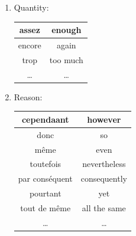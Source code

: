 \documentclass{book}
\begin{document}
\begin{enumerate}
            \item Quantity:
                \begin{center}
                    \begin{tabular}{|c|c|}
                        \hline
                        assez & enough \\
                        \hline
                        encore & again \\
                        \hline
                        trop & too much \\
                        \hline
                        \dots & \dots \\
                        \hline
                    \end{tabular}
                \end{center}
                
            \item Reason:
                \begin{center}
                    \begin{tabular}{|c|c|}
                        \hline
                        cependaant & however \\
                        \hline
                        donc & so \\
                        \hline
                        même & even \\
                        \hline
                        toutefois & nevertheless \\
                        \hline
                        par conséquent & consequently \\
                        \hline
                        pourtant & yet \\
                        \hline
                        tout de même & all the same \\
                        \hline
                        \dots & \dots \\
                        \hline
                    \end{tabular}
                \end{center}


\end{enumerate}
\end{document}
